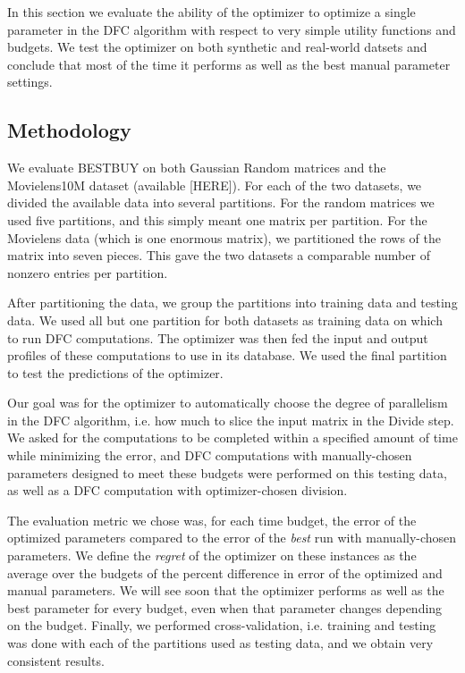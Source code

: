 
In this section we evaluate the ability of the optimizer to optimize a single parameter in the DFC algorithm with respect to very simple utility functions and budgets. We test the optimizer on both synthetic and real-world datsets and conclude that most of the time it performs as well as the best manual parameter settings. 

\subsection{Methodology}

We evaluate BESTBUY on both Gaussian Random matrices and the Movielens10M dataset (available [HERE]). For each of the two datasets, we divided the available data into several partitions. For the random matrices we used five partitions, and this simply meant one matrix per partition. For the Movielens data (which is one enormous matrix), we partitioned the rows of the matrix into seven pieces. This gave the two datasets a comparable number of nonzero entries per partition. 

After partitioning the data, we group the partitions into training data and testing data. We used all but one partition for both datasets as training data on which to run DFC computations. The optimizer was then fed the input and output profiles of these computations to use in its database. We used the final partition to test the predictions of the optimizer. 

Our goal was for the optimizer to automatically choose the degree of parallelism in the DFC algorithm, i.e. how much to slice the input matrix in the Divide step. We asked for the computations to be completed within a specified amount of time while minimizing the error, and DFC computations with manually-chosen parameters designed to meet these budgets were performed on this testing data, as well as a DFC computation with optimizer-chosen division. 

The evaluation metric we chose was, for each time budget, the error of the optimized parameters compared to the error of the \emph{best} run with manually-chosen parameters. We define the \emph{regret} of the optimizer on these instances as the average over the budgets of the percent difference in error of the optimized and manual parameters. We will see soon that the optimizer performs as well as the best parameter for every budget, even when that parameter changes depending on the budget. Finally, we performed cross-validation, i.e. training and testing was done with each of the partitions used as testing data, and we obtain very consistent results. 

